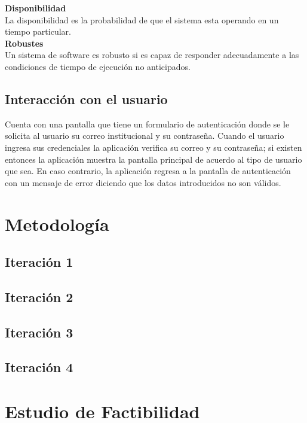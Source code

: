 \textbf{Disponibilidad\\}
La disponibilidad es la probabilidad de que el sistema esta operando en un tiempo particular.\\ 

\textbf{Robustes\\}
Un sistema de software es robusto si es capaz de responder adecuadamente a las condiciones de tiempo de ejecución no anticipados.\\


\subsection{Interacción con el usuario}

Cuenta con una pantalla que tiene un formulario de autenticación donde se le solicita al usuario su correo institucional y su contraseña. Cuando el usuario ingresa sus credenciales la aplicación verifica su correo y su contraseña; si existen entonces la aplicación muestra la pantalla principal de acuerdo al tipo de usuario que sea. En caso contrario, la aplicación regresa a la pantalla de autenticación con un mensaje de error diciendo que los datos introducidos no son válidos.

\section{Metodología}

\subsection{Iteración 1}

\subsection{Iteración 2}

\subsection{Iteración 3}

\subsection{Iteración 4}

\section{Estudio de Factibilidad}

